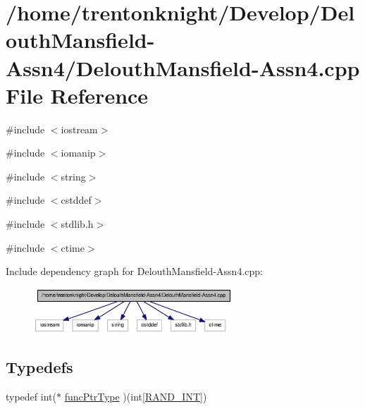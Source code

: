 \hypertarget{_delouth_mansfield-_assn4_8cpp}{
\section{/home/trentonknight/Develop/DelouthMansfield-\/Assn4/DelouthMansfield-\/Assn4.cpp File Reference}
\label{_delouth_mansfield-_assn4_8cpp}
}
{\ttfamily \#include $<$iostream$>$}\par
{\ttfamily \#include $<$iomanip$>$}\par
{\ttfamily \#include $<$string$>$}\par
{\ttfamily \#include $<$cstddef$>$}\par
{\ttfamily \#include $<$stdlib.h$>$}\par
{\ttfamily \#include $<$ctime$>$}\par
Include dependency graph for DelouthMansfield-\/Assn4.cpp:\nopagebreak
\begin{figure}[H]
\begin{center}
\leavevmode
\includegraphics[width=211pt]{_delouth_mansfield-_assn4_8cpp__incl}
\end{center}
\end{figure}
\subsection*{Typedefs}
\begin{DoxyCompactItemize}
\item 
typedef int($\ast$ \hyperlink{_delouth_mansfield-_assn4_8cpp_ae2987d0004dea58df8c833858c0fb370}{funcPtrType} )(int\mbox{[}\hyperlink{_delouth_mansfield-_assn4_8cpp_a134c2ba56ae9ba89c77a5c0dba9f2124}{RAND\_\-INT}\mbox{]})
\end{DoxyCompactItemize}
